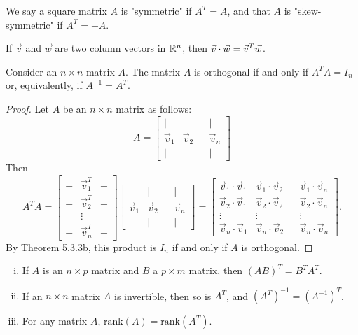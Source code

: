 \documentclass[a4paper,11pt]{article}
\begin{document}
\begin{outline}
    We say a square matrix \(A\) is "symmetric" if \(A^T = A\), and that \(A\) is "skew-symmetric" if \(A^T = -A\).

    If \(\vec{v}\) and \(\vec{w}\) are two column vectors in \(\mathbb{R}^n\), then \(\vec{v}\cdot\vec{w} = \vec{v}^T\vec{w}\).

    Consider an \(n \times n\) matrix \(A\). The matrix \(A\) is orthogonal if and only if \(A^TA = I_n\) or, equivalently,
    if \(A^{-1} = A^T\).

    \begin{proof}
      Let \(A\) be an \(n \times n\) matrix as follows:
      \[ A = \begin{bmatrix} \vert & \vert & & \vert \\ \vec{v}_1 & \vec{v}_2 & & \vec{v}_n \\ \vert & \vert & & \vert \end{bmatrix} \]
      Then
      \[
      A^TA = \begin{bmatrix}- & \vec{v}_1^T & - \\ - & \vec{v}_2^T & - \\ & \vdots & \\  - & \vec{v}_n^T & -\end{bmatrix}
             \begin{bmatrix} \vert & \vert & & \vert \\ \vec{v}_1 & \vec{v}_2 & & \vec{v}_n \\ \vert & \vert & & \vert \end{bmatrix}
           = \begin{bmatrix}
               \vec{v}_1\cdot\vec{v}_1 & \vec{v}_1\cdot\vec{v}_2 & & \vec{v}_1\cdot\vec{v}_n\\
               \vec{v}_2\cdot\vec{v}_1 & \vec{v}_2\cdot\vec{v}_2 & & \vec{v}_2\cdot\vec{v}_n\\
               \vdots & \vdots & & \vdots                                                   \\
               \vec{v}_n\cdot\vec{v}_1 & \vec{v}_n\cdot\vec{v}_2 & & \vec{v}_n\cdot\vec{v}_n
             \end{bmatrix}
             \text{.}
      \]
      By Theorem 5.3.3b, this product is \(I_n\) if and only if \(A\) is orthogonal.
    \end{proof}

    \begin{enumerate}[i.]
      \item If \(A\) is an \(n \times p\) matrix and \(B\) a \(p \times m\) matrix, then \((AB)^T = B^TA^T\).
      \item If an \(n \times n\) matrix \(A\) is invertible, then so is \(A^T\), and \((A^T)^{-1} = (A^{-1})^T\).
      \item For any matrix \(A\), \(\text{rank}(A) = \text{rank}(A^T)\).
    \end{enumerate}


\end{outline}
\end{document}
